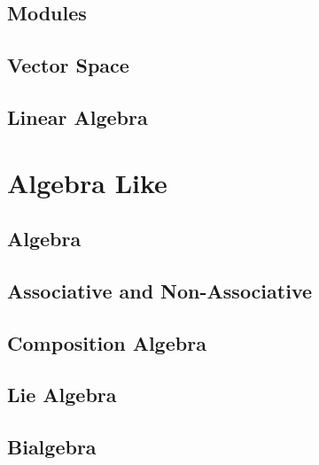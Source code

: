 \documentclass[a4paper, 12pt]{article}
\numberwithin{equation}{section}
\begin{document}
\subsection{Modules}
\subsection{Vector Space}
\subsection{Linear Algebra}

\newpage
\section{Algebra Like}
\subsection{Algebra}
\subsection{Associative and Non-Associative}
\subsection{Composition Algebra}
\subsection{Lie Algebra}
\subsection{Bialgebra}
\end{document}
